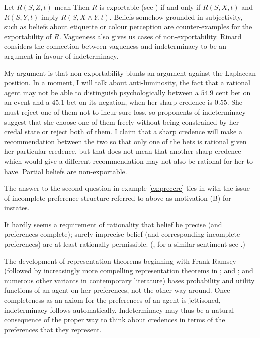 \documentclass[12pt]{article}
\begin{document}
Let $R(S,Z,t)$ mean  Then $R$ is exportable (see ) if
and only if $R(S,X,t)$ and $R(S,Y,t)$ imply $R(S,X\wedge{}Y,t)$.
Beliefs somehow grounded in subjectivity, such as beliefs about
etiquette or colour perception are counter-examples for the
exportability of $R$. Vagueness also gives us cases of
non-exportability. Rinard considers the connection between vagueness
and indeterminacy to be an argument in favour of indeterminacy.

My argument is that non-exportability blunts an argument against the
Laplacean position. In a moment, I will talk about anti-luminosity,
the fact that a rational agent may not be able to distinguish
psychologically between a $54.9$ cent bet on an event and a $45.1$ bet
on its negation, when her sharp credence is $0.55$. She must reject
one of them not to incur sure loss, so proponents of indeterminacy
suggest that she choose one of them freely without being constrained
by her credal state or reject both of them. I claim that a sharp
credence will make a recommendation between the two so that only one
of the bets is rational given her particular credence, but that does
not mean that another sharp credence which would give a different
recommendation may not also be rational for her to have. Partial
beliefs are non-exportable.

The answer to the second question in example \ref{ex:preccre} ties in
with the issue of incomplete preference structure referred to above as
motivation (B) for instates.

\begin{quotex}
  It hardly seems a requirement of rationality that belief be precise
  (and preferences complete); surely imprecise belief (and
  corresponding incomplete preferences) are at least rationally
  permissible. (, for a similar sentiment
  see .)
\end{quotex}

The development of representation theorems beginning with Frank Ramsey
(followed by increasingly more compelling representation theorems in
; and ; and numerous other
variants in contemporary literature) bases probability and utility
functions of an agent on her preferences, not the other way around.
Once completeness as an axiom for the preferences of an agent is
jettisoned, indeterminacy follows automatically. Indeterminacy may
thus be a natural consequence of the proper way to think about
credences in terms of the preferences that they represent.
\end{document}
